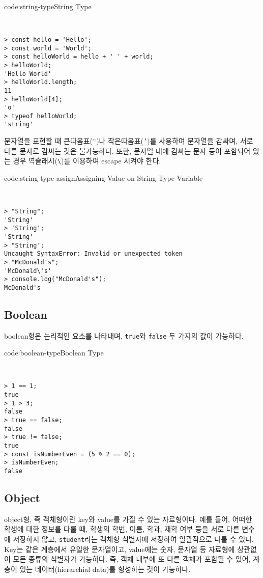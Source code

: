 \begin{codeenv}{code:string-type}{String Type}\begin{verbatim}


> const hello = 'Hello';
> const world = 'World';
> const helloWorld = hello + ' ' + world;
> helloWorld;
'Hello World'
> helloWorld.length;
11
> helloWorld[4];
'o'
> typeof helloWorld;
'string'
\end{verbatim}
\end{codeenv}

문자열을 표현할 때 큰따옴표(\texttt{"})나 작은따옴표(\texttt{'})를 사용하여 문자열을 감싸며, 서로 다른 문자로 감싸는 것은 불가능하다. 또한, 문자열 내에 감싸는 문자 등이 포함되어 있는 경우 역슬래시(\verb|\|)를 이용하여 escape 시켜야 한다.

\begin{codeenv}{code:string-type-assign}{Assigning Value on String Type Variable}\begin{verbatim}


> "String";
'String'
> 'String';
'String'
> "String';
Uncaught SyntaxError: Invalid or unexpected token
> "McDonald's";
'McDonald\'s'
> console.log("McDonald's");
McDonald's
\end{verbatim}
\end{codeenv}

\subsection*{Boolean}

boolean형은 논리적인 요소를 나타내며, \texttt{true}와 \texttt{false} 두 가지의 값이 가능하다.

\begin{codeenv}{code:boolean-type}{Boolean Type}\begin{verbatim}


> 1 == 1;
true
> 1 > 3;
false
> true == false;
false
> true != false;
true
> const isNumberEven = (5 % 2 == 0);
> isNumberEven;
false
\end{verbatim}
\end{codeenv}

\subsection*{Object}

object형, 즉 객체형이란 key와 value를 가질 수 있는 자료형이다. 예를 들어, 어떠한 학생에 대한 정보를 다룰 때, 학생의 학번, 이름, 학과, 재학 여부 등을 서로 다른 변수에 저장하지 않고, \texttt{student}라는 객체형 식별자에 저장하여 일괄적으로 다룰 수 있다. Key는 같은 계층에서 유일한 문자열이고, value에는 숫자, 문자열 등 자료형에 상관없이 모든 종류의 식별자가 가능하다. 즉, 객체 내부에 또 다른 객체가 포함될 수 있어, 계층이 있는 데이터(hierarchial data)를 형성하는 것이 가능하다.

